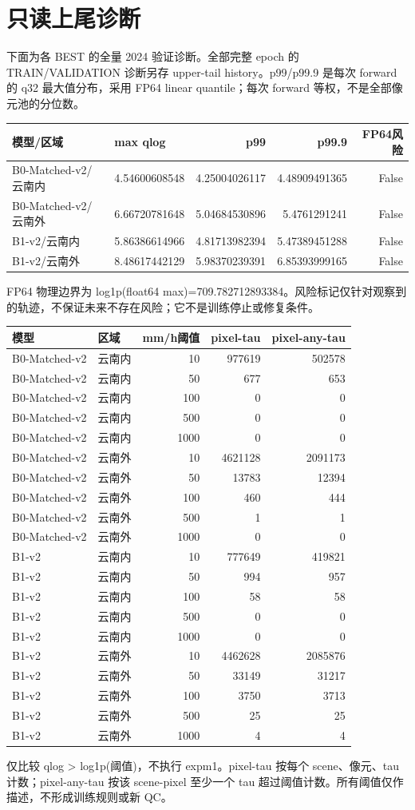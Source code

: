 \documentclass[UTF8,a4paper,11pt,fontset=windows]{ctexart}
\begin{document}
\section{只读上尾诊断}
下面为各 BEST 的全量 2024 验证诊断。全部完整 epoch 的 TRAIN/VALIDATION 诊断另存 upper-tail history。p99/p99.9 是每次 forward 的 q32 最大值分布，采用 FP64 linear quantile；每次 forward 等权，不是全部像元池的分位数。
\begin{longtable}{llrrr}\toprule 模型/区域 & max qlog & p99 & p99.9 & FP64风险\\\midrule\endhead
B0-Matched-v2/云南内 & 4.54600608548 & 4.25004026117 & 4.48909491365 & False\\
B0-Matched-v2/云南外 & 6.66720781648 & 5.04684530896 & 5.4761291241 & False\\
B1-v2/云南内 & 5.86386614966 & 4.81713982394 & 5.47389451288 & False\\
B1-v2/云南外 & 8.48617442129 & 5.98370239391 & 6.85393999165 & False\\
\bottomrule\end{longtable}
FP64 物理边界为 log1p(float64 max)=709.782712893384。风险标记仅针对观察到的轨迹，不保证未来不存在风险；它不是训练停止或修复条件。
\begin{longtable}{llrrr}\toprule 模型 & 区域 & mm/h阈值 & pixel-tau & pixel-any-tau\\\midrule\endhead
B0-Matched-v2 & 云南内 & 10 & 977619 & 502578\\
B0-Matched-v2 & 云南内 & 50 & 677 & 653\\
B0-Matched-v2 & 云南内 & 100 & 0 & 0\\
B0-Matched-v2 & 云南内 & 500 & 0 & 0\\
B0-Matched-v2 & 云南内 & 1000 & 0 & 0\\
B0-Matched-v2 & 云南外 & 10 & 4621128 & 2091173\\
B0-Matched-v2 & 云南外 & 50 & 13783 & 12394\\
B0-Matched-v2 & 云南外 & 100 & 460 & 444\\
B0-Matched-v2 & 云南外 & 500 & 1 & 1\\
B0-Matched-v2 & 云南外 & 1000 & 0 & 0\\
B1-v2 & 云南内 & 10 & 777649 & 419821\\
B1-v2 & 云南内 & 50 & 994 & 957\\
B1-v2 & 云南内 & 100 & 58 & 58\\
B1-v2 & 云南内 & 500 & 0 & 0\\
B1-v2 & 云南内 & 1000 & 0 & 0\\
B1-v2 & 云南外 & 10 & 4462628 & 2085876\\
B1-v2 & 云南外 & 50 & 33149 & 31217\\
B1-v2 & 云南外 & 100 & 3750 & 3713\\
B1-v2 & 云南外 & 500 & 25 & 25\\
B1-v2 & 云南外 & 1000 & 4 & 4\\
\bottomrule\end{longtable}
仅比较 qlog > log1p(阈值)，不执行 expm1。pixel-tau 按每个 scene、像元、tau 计数；pixel-any-tau 按该 scene-pixel 至少一个 tau 超过阈值计数。所有阈值仅作描述，不形成训练规则或新 QC。
\end{document}
